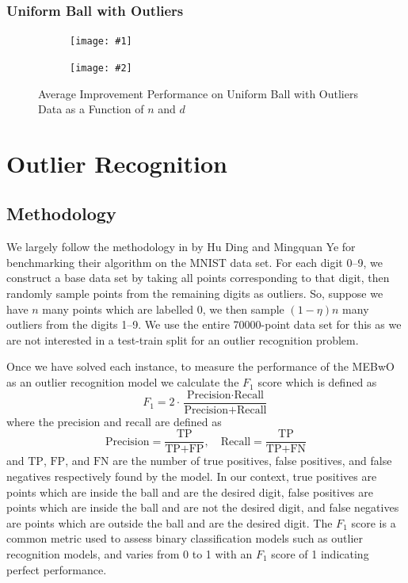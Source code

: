 \documentclass[11pt,twoside]{report}
\newcommand{\pairfigure}[4]{
    \begin{figure}[ht]
        \centering
        \begin{subfigure}[b]{0.475\textwidth}
            \centering
            \texttt{[image: \#1]}
        \end{subfigure}
        \hfill
        \begin{subfigure}[b]{0.475\textwidth}
            \centering
            \texttt{[image: \#2]}
        \end{subfigure}
        \caption{#3}
        \label{#4}
\end{figure}
}
\newcommand{\imprfigure}[3]{
    \pairfigure{improvement_r_benchmarks/avg_pct_func_n_d100_eta0p9_#1.png}{improvement_r_benchmarks/avg_pct_func_d_n1000_eta0p9_#1.png}{#2}{#3}
}
\theoremstyle{definition}
\numberwithin{theorem}{section}
\numberwithin{definition}{section}
\numberwithin{lemma}{section}
\numberwithin{proposition}{section}
\numberwithin{equation}{section}
\numberwithin{figure}{section}
\begin{document}
\subsubsection{Uniform Ball with Outliers}
\imprfigure{uniform_ball_with_outliers}{Average Improvement Performance on Uniform Ball with Outliers Data as a Function of $n$ and $d$}{fig:improvement_unifballwoutliers}

\section{Outlier Recognition}
\subsection{Methodology}
We largely follow the methodology in \cite[Section 4.2]{huding} by Hu Ding and Mingquan Ye for benchmarking their algorithm on the MNIST data set. For each digit 0--9, we construct a base data set by taking all points corresponding to that digit, then randomly sample points from the remaining digits as outliers. So, suppose we have $n$ many points which are labelled 0, we then sample $(1-\eta)n$ many outliers from the digits 1--9. We use the entire 70000-point data set for this as we are not interested in a test-train split for an outlier recognition problem.

Once we have solved each instance, to measure the performance of the MEBwO as an outlier recognition model we calculate the $F_1$ score which is defined as
\begin{equation*}
    F_1 = 2\cdot\frac{\text{Precision}\cdot\text{Recall}}{\text{Precision}+\text{Recall}}
\end{equation*}
where the precision and recall are defined as 
\begin{equation*}
    \text{Precision} = \frac{\text{TP}}{\text{TP} + \text{FP}},\quad \text{Recall} = \frac{\text{TP}}{\text{TP}+\text{FN}}
\end{equation*}
and $\text{TP}$, $\text{FP}$, and $\text{FN}$ are the number of true positives, false positives, and false negatives respectively found by the model. In our context, true positives are points which are inside the ball and are the desired digit, false positives are points which are inside the ball and are not the desired digit, and false negatives are points which are outside the ball and are the desired digit. The $F_1$ score is a common metric used to assess binary classification models such as outlier recognition models, and varies from 0 to 1 with an $F_1$ score of 1 indicating perfect performance.
\end{document}
